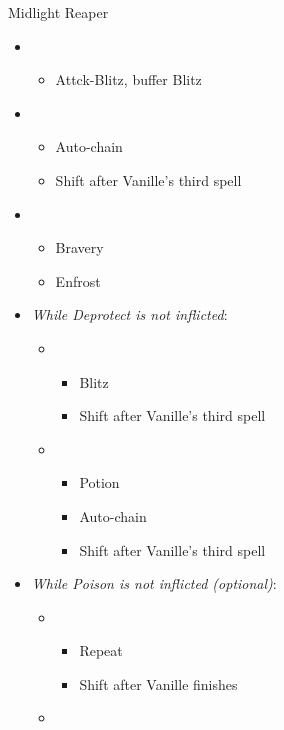 \begin{multicols}{2}
\begin{battle}{Midlight Reaper}
\begin{itemize}
    \item \first
    \begin{itemize}
        \item Attck-Blitz, buffer Blitz
    \end{itemize}
    \item \fifth
    \begin{itemize}
        \item Auto-chain
        \item Shift after Vanille's third spell
    \end{itemize}
    \item \third
    \begin{itemize}
        \item Bravery
        \item Enfrost
    \end{itemize}
    \item \textit{While Deprotect is not inflicted}:
    \begin{itemize}
    \item \sixth
    \begin{itemize}
        \item Blitz
        \item Shift after Vanille's third spell
    \end{itemize}
    \item \fifth
    \begin{itemize}
        \item Potion
        \item Auto-chain
        \item Shift after Vanille's third spell
    \end{itemize}
    \end{itemize}
    \item \textit{While Poison is not inflicted (optional)}:
    \begin{itemize}
        \item \first
        \begin{itemize}
            \item Repeat
            \item Shift after Vanille finishes
        \end{itemize}
        \item \sixth
        \begin{itemize}

\end{itemize}
\end{itemize}
\end{itemize}
\end{battle}
\end{multicols}
